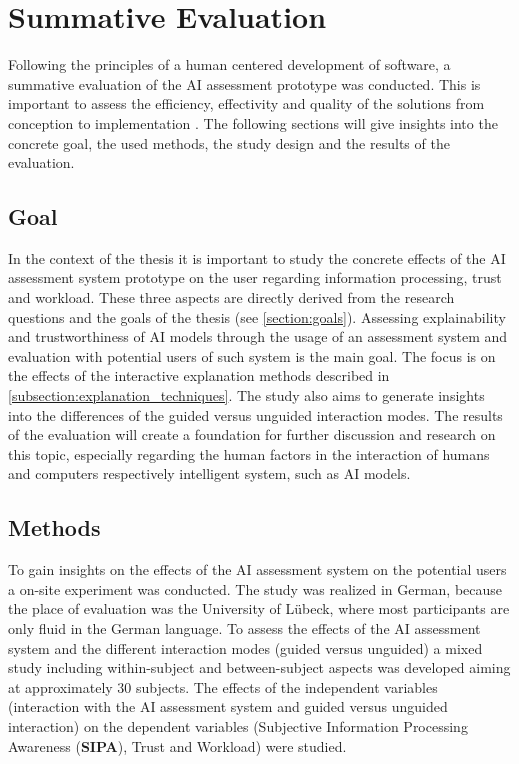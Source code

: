 \documentclass[11pt,a4paper,english]{scrreprt}
\begin{document}
\newpage
\chapter{Summative Evaluation}\label{chapter:evaluation}
Following the principles of a human centered development of software, a summative evaluation of the AI assessment prototype was conducted. This is important to assess the efficiency, effectivity and quality of the solutions from conception to implementation \parencite{gediga_evaluation_2002}. The following sections will give insights into the concrete goal, the used methods, the study design and the results of the evaluation.

\section{Goal}
In the context of the thesis it is important to study the concrete effects of the AI assessment system prototype on the user regarding information processing, trust and workload. These three aspects are directly derived from the research questions and the goals of the thesis (see \autoref{section:goals}). Assessing explainability and trustworthiness of AI models through the usage of an assessment system and evaluation with potential users of such system is the main goal. The focus is on the effects of the interactive explanation methods described in \autoref{subsection:explanation_techniques}. The study also aims to generate insights into the differences of the guided versus unguided interaction modes. The results of the evaluation will create a foundation for further discussion and research on this topic, especially regarding the human factors in the interaction of humans and computers respectively intelligent system, such as AI models.

\section{Methods}
To gain insights on the effects of the AI assessment system on the potential users a on-site experiment was conducted. The study was realized in German, because the place of evaluation was the University of Lübeck, where most participants are only fluid in the German language. To assess the effects of the AI assessment system and the different interaction modes (guided versus unguided) a mixed study including within-subject and between-subject aspects was developed aiming at approximately 30 subjects. The effects of the independent variables (interaction with the AI assessment system and guided versus unguided interaction) on the dependent variables (Subjective Information Processing Awareness (\textbf{SIPA}), Trust and Workload) were studied.
\end{document}
